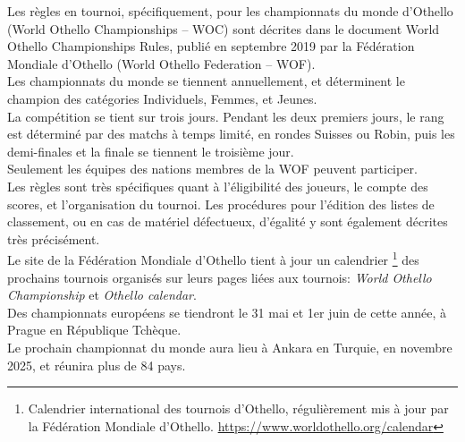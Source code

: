 \documentclass[a4paper,12pt]{article}
\begin{document}
Les règles en tournoi, spécifiquement, pour les championnats du monde d’Othello
(World Othello Championships – WOC) sont décrites dans le document World
Othello Championships Rules, publié en septembre 2019 par la Fédération
Mondiale d’Othello (World Othello Federation – WOF).\cite{WOCRules2023}\\ Les
championnats du monde se tiennent annuellement, et déterminent le champion des
catégories Individuels, Femmes, et Jeunes.\\ La compétition se tient sur trois
jours. Pendant les deux premiers jours, le rang est déterminé par des matchs à
temps limité, en rondes Suisses ou Robin, puis les demi-finales et la finale se
tiennent le troisième jour.\\ Seulement les équipes des nations membres de la
WOF peuvent participer.\\ Les règles sont très spécifiques quant à
l’éligibilité des joueurs, le compte des scores, et l’organisation du tournoi.
Les procédures pour l’édition des listes de classement, ou en cas de matériel
défectueux, d’égalité y sont également décrites très précisément.\\ \newpage Le
site de la Fédération Mondiale d’Othello tient à jour un calendrier
\footnote{Calendrier international des tournois d'Othello, régulièrement mis à
    jour par la Fédération Mondiale d'Othello.
    \url{https://www.worldothello.org/calendar}} des prochains tournois organisés
sur leurs pages liées aux tournois: \textit{World Othello Championship} et
\textit{Othello calendar}.\cite{WOFCalendar}\cite{WOCTournaments}\\ Des
championnats européens se tiendront le 31 mai et 1er juin de cette année, à
Prague en République Tchèque.\\ Le prochain championnat du monde aura lieu à
Ankara en Turquie, en novembre 2025, et réunira plus de 84 pays.\\
\end{document}
